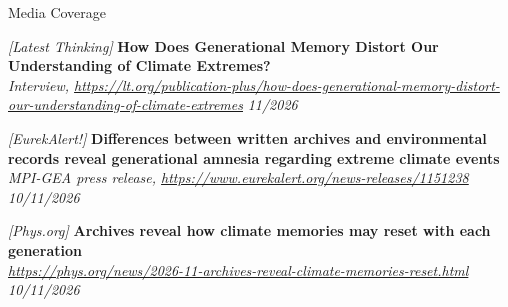 \documentclass{resume} %
\newcommand{\projectentry}[4]{\textit{[#1]} {\bf #2} \\ \textnormal{\em #3} \hfill {\em #4}}
\begin{document}
\begin{rSection}{Media Coverage}

    \projectentry{Latest Thinking}{How Does Generational Memory Distort Our Understanding of Climate Extremes?}{Interview, \url{https://lt.org/publication-plus/how-does-generational-memory-distort-our-understanding-of-climate-extremes}}{11/2026}

    \projectentry{EurekAlert!}{Differences between written archives and environmental records reveal generational amnesia regarding extreme climate events}{MPI-GEA press release, \url{https://www.eurekalert.org/news-releases/1151238}}{10/11/2026}

    \projectentry{Phys.org}{Archives reveal how climate memories may reset with each generation}{\url{https://phys.org/news/2026-11-archives-reveal-climate-memories-reset.html}}{10/11/2026}

\end{rSection}

\end{document}
